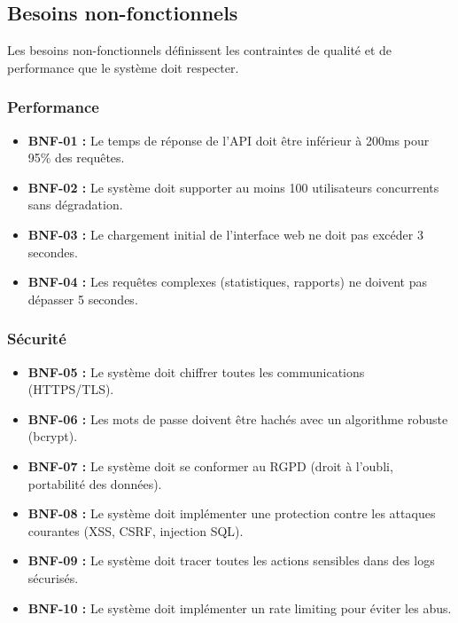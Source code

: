 \subsection{Besoins non-fonctionnels}

Les besoins non-fonctionnels définissent les contraintes de qualité et de performance que le système doit respecter.

\subsubsection{Performance}

\begin{itemize}
    \item \textbf{BNF-01 :} Le temps de réponse de l'API doit être inférieur à 200ms pour 95\% des requêtes.
    
    \item \textbf{BNF-02 :} Le système doit supporter au moins 100 utilisateurs concurrents sans dégradation.
    
    \item \textbf{BNF-03 :} Le chargement initial de l'interface web ne doit pas excéder 3 secondes.
    
    \item \textbf{BNF-04 :} Les requêtes complexes (statistiques, rapports) ne doivent pas dépasser 5 secondes.
\end{itemize}

\subsubsection{Sécurité}

\begin{itemize}
    \item \textbf{BNF-05 :} Le système doit chiffrer toutes les communications (HTTPS/TLS).
    
    \item \textbf{BNF-06 :} Les mots de passe doivent être hachés avec un algorithme robuste (bcrypt).
    
    \item \textbf{BNF-07 :} Le système doit se conformer au RGPD (droit à l'oubli, portabilité des données).
    
    \item \textbf{BNF-08 :} Le système doit implémenter une protection contre les attaques courantes (XSS, CSRF, injection SQL).
    
    \item \textbf{BNF-09 :} Le système doit tracer toutes les actions sensibles dans des logs sécurisés.
    
    \item \textbf{BNF-10 :} Le système doit implémenter un rate limiting pour éviter les abus.
\end{itemize}

